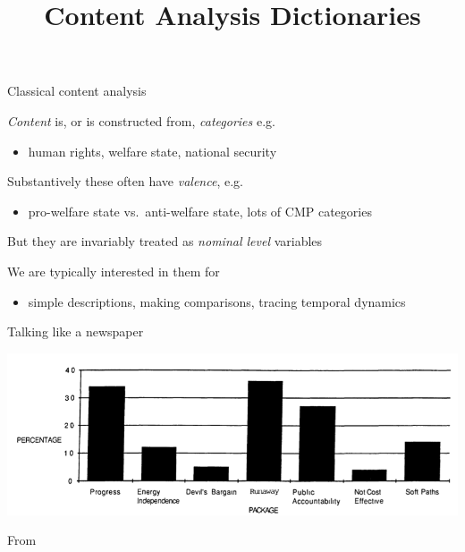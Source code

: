 \documentclass{hertieteaching}
\title{Content Analysis Dictionaries}
\begin{document}
\maketitle


\begin{frame}{Classical content analysis}

\emph{Content} is, or is constructed from, \emph{categories} e.g.

\begin{itemize}
\item
  human rights, welfare state, national security
\end{itemize}

Substantively these often have \emph{valence}, e.g.

\begin{itemize}
\item
  pro-welfare state vs.~anti-welfare state, lots of CMP categories
\end{itemize}

But they are invariably treated as \emph{nominal level} variables

We are typically interested in them for

\begin{itemize}
\item
  simple descriptions, making comparisons, tracing temporal dynamics
\end{itemize}

\end{frame}

\begin{frame}{Talking like a newspaper}

{\centering \includegraphics[width=0.9\linewidth]{pictures/gamson-modigliani-frames-opinion} 
}

\centerline{From \textcite{Gamson.Modigliani1989}}

\end{frame}
\end{document}
